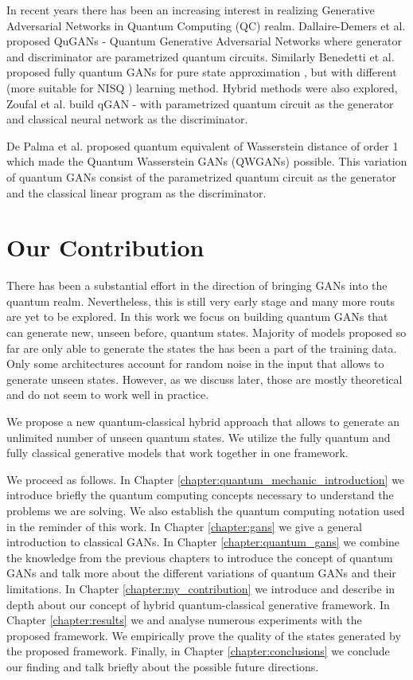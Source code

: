 In recent years there has been an increasing interest in realizing Generative
Adversarial Networks in Quantum Computing (QC) realm. Dallaire-Demers et al.
proposed QuGANs \cite{Dallaire_Demers_2018} - Quantum Generative Adversarial Networks
where generator and discriminator are parametrized quantum circuits. Similarly
Benedetti et al. proposed fully quantum GANs for pure state approximation \cite{Benedetti_2019}, but
with different (more suitable for NISQ \cite{Preskill_2018}) learning method.
Hybrid methods were also explored, Zoufal et al. build qGAN \cite{Zoufal_2019} -
with parametrized quantum circuit as the generator and classical neural network
as the discriminator. 

De Palma et al. proposed quantum equivalent of Wasserstein distance of order 1
\cite{depalma2020quantum} which made the Quantum Wasserstein GANs
(QWGANs) \cite{kiani2021quantum} possible. This variation of quantum GANs
consist of the parametrized quantum circuit as the generator and the classical linear
program as the discriminator.

\section{Our Contribution}
There has been a substantial effort in the direction of bringing GANs into the quantum
realm. Nevertheless, this is still very early stage and many more routs are yet
to be explored. In this work we focus on building quantum GANs that can generate
new, unseen before, quantum states. Majority of models proposed so far are only
able to generate the states the has been a part of the training data. Only some
architectures \cite{Dallaire_Demers_2018} account for random noise in the input
that allows to generate unseen states. However, as we discuss later, those are
mostly theoretical and do not seem to work well in practice.


We propose a new quantum-classical hybrid approach that allows to generate
an unlimited number of unseen quantum states. We utilize the fully quantum and fully
classical generative models that work together in one framework. 

We proceed as follows. In Chapter \ref{chapter:quantum_mechanic_introduction} we
introduce briefly the quantum computing concepts necessary to understand the
problems we are solving. We also establish the quantum computing notation used
in the reminder of this work. In Chapter \ref{chapter:gans} we give a general
introduction to classical GANs. In Chapter
\ref{chapter:quantum_gans} we combine the knowledge from the previous chapters to
introduce the concept of quantum GANs and talk more about the different
variations of quantum GANs and their limitations. In Chapter
\ref{chapter:my_contribution} we introduce and describe in depth about our concept of hybrid
quantum-classical generative framework. In Chapter \ref{chapter:results} we
and analyse numerous experiments with the proposed framework. We
empirically prove the quality of the states generated by the proposed framework.
Finally, in Chapter \ref{chapter:conclusions} we conclude our finding and talk
briefly about the possible future directions.

